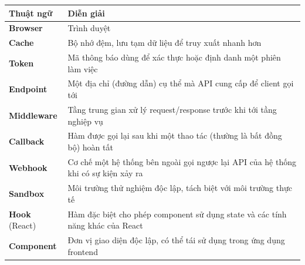 \documentclass[../DoAn.tex]{subfiles}
\begin{document}
\begin{longtable}{p{3cm} p{11cm}}
	\hline
   \textbf{Thuật ngữ}  & \textbf{Diễn giải} \\ \hline
	\textbf{Browser} & Trình duyệt \\
	\textbf{Cache} & Bộ nhớ đệm, lưu tạm dữ liệu để truy xuất nhanh hơn \\
	\textbf{Token} & Mã thông báo dùng để xác thực hoặc định danh một phiên làm việc \\
	\textbf{Endpoint} & Một địa chỉ (đường dẫn) cụ thể mà API cung cấp để client gọi tới \\
	\textbf{Middleware} & Tầng trung gian xử lý request/response trước khi tới tầng nghiệp vụ \\
	\textbf{Callback} & Hàm được gọi lại sau khi một thao tác (thường là bất đồng bộ) hoàn tất \\
	\textbf{Webhook} & Cơ chế một hệ thống bên ngoài gọi ngược lại API của hệ thống khi có sự kiện xảy ra \\
	\textbf{Sandbox} & Môi trường thử nghiệm độc lập, tách biệt với môi trường thực tế \\
	\textbf{Hook} (React) & Hàm đặc biệt cho phép component sử dụng state và các tính năng khác của React \\
	\textbf{Component} & Đơn vị giao diện độc lập, có thể tái sử dụng trong ứng dụng frontend \\
    \hline
\end{longtable}
\end{document}
